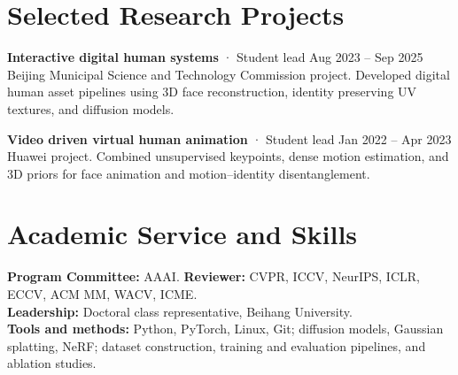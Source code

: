 \documentclass[10pt,a4paper]{article}
\begin{document}
\section{Selected Research Projects}
\textbf{Interactive digital human systems} · Student lead \hfill {\small Aug 2023 -- Sep 2025}\\
{\small Beijing Municipal Science and Technology Commission project. Developed digital human asset pipelines using 3D face reconstruction, identity preserving UV textures, and diffusion models.}
\par\vspace{4pt}
\textbf{Video driven virtual human animation} · Student lead \hfill {\small Jan 2022 -- Apr 2023}\\
{\small Huawei project. Combined unsupervised keypoints, dense motion estimation, and 3D priors for face animation and motion--identity disentanglement.}

\section{Academic Service and Skills}
{\small
\textbf{Program Committee:} AAAI. \quad \textbf{Reviewer:} CVPR, ICCV, NeurIPS, ICLR, ECCV, ACM MM, WACV, ICME.\\
\textbf{Leadership:} Doctoral class representative, Beihang University.\\
\textbf{Tools and methods:} Python, PyTorch, Linux, Git; diffusion models, Gaussian splatting, NeRF; dataset construction, training and evaluation pipelines, and ablation studies.}

\newpage
\end{document}
